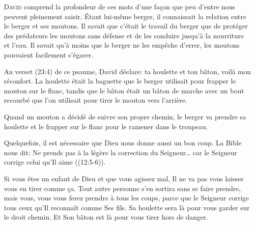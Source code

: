

\lettrine{D}{avid} comprend la profondeur de ces mots
 d'une fa\c{c}on que peu d'entre nous peuvent pleinement saisir.
 Étant lui-même berger, il connaissait la relation entre le berger
 et ses moutons.
 Il savait que c'était le travail du berger que de protéger
 des prédateurs les moutons sans défense et de les conduire
 jusqu'à la nourriture et l'eau.
 Il savait qu'à moins que le berger ne les empêche d'errer,
 les moutons pouvaient facilement s'égarer.

Au verset (23:4) de ce psaume, David déclare:
 \Og ta houlette et ton bâton, voilà mon réconfort. \Fg{}
 La houlette était la baguette que le berger utilisait
 pour frapper le mouton sur le flanc, tandis que le bâton
 était un bâton de marche avec un bout recourbé
 que l'on utilisait pour tirer le mouton vers l'arrière.


Quand un mouton a décidé de suivre son propre chemin,
 le berger va prendre sa houlette et le frapper
 sur le flanc pour le ramener dans le troupeau.

Quelquefois, il est nécessaire que Dieu nous donne aussi un bon coup.
 La Bible nous dit:
 \Og Ne prends pas à la légère la correction du Seigneur\dots{}
 car le Seigneur corrige celui qu'Il aime \Fg{} ((12:5-6)).

Si vous êtes un enfant de Dieu et que vous agissez mal,
 Il ne va pas vous laisser vous en tirer comme \c{c}a.
 Tout autre personne s'en sortira sans se faire prendre, mais vous,
 vous vous ferez prendre à tous les coups, parce que le Seigneur
 corrige tous ceux qu'Il reconnaît comme Ses fils.
 Sa houlette sera là pour vous garder sur le droit chemin.
 Et Son bâton est là pour vous tirer hors de danger. 

\dvrule





